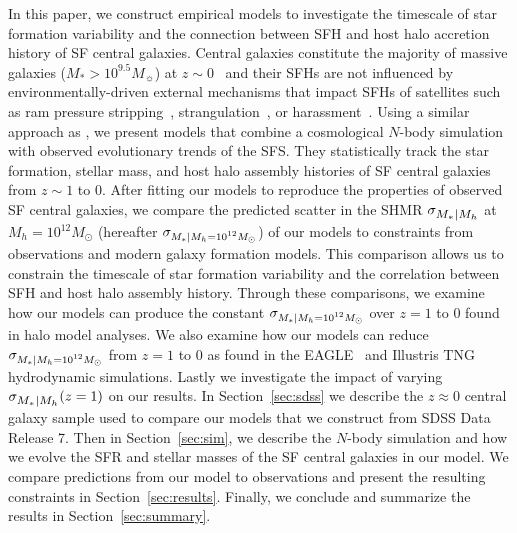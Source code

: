 \documentclass[12pt, letterpaper, preprint, tighten]{aastex62}
\newcommand{\siglogm}{\sigma_{\scaleto{M_*|M_h}{8pt}}}
\newcommand{\sigtwe}{\sigma_{\scaleto{M_*|M_h=10^{12}M_\odot}{8pt}}}
\begin{document}
In this paper, we construct empirical models to investigate the timescale
of star formation variability and the connection between SFH and host halo
accretion history of SF central galaxies. Central galaxies constitute the 
majority of massive galaxies ($M_*>10^{9.5}M_\sun$) at $z\sim0$~\citep{wetzel2013} 
and their SFHs are not influenced by environmentally-driven external 
mechanisms that impact SFHs of satellites such as ram pressure 
stripping~\citep{gunn1972,bekki2009}, strangulation~\citep{larson1980, peng2015}, 
or harassment~\citep{moore1998}. Using a similar approach as \cite{wetzel2013, hahn2017b}, 
we present models that combine a cosmological $N$-body simulation with observed 
evolutionary trends of the SFS. They statistically 
track the star formation, stellar mass, and host halo assembly histories of 
SF central galaxies from $z\sim1$ to $0$. After fitting our models to reproduce 
the properties of observed SF central galaxies, we compare the predicted 
scatter in the SHMR $\siglogm$ at $M_h=10^{12}M_\odot$ (hereafter $\sigtwe$) 
of our models to constraints from observations and modern galaxy formation 
models. This comparison allows us to constrain the timescale of star formation 
variability and the correlation between SFH and host halo assembly history. 
Through these comparisons, we examine how our models can produce the constant 
$\sigtwe$ over $z=1$ to 0 found in halo model analyses. We also examine how 
our models can reduce $\sigtwe$ from $z=1$ to 0 as found in the EAGLE~\citep{matthee2017} 
and Illustris TNG~\citep{pillepich2018} hydrodynamic simulations. Lastly 
we investigate the impact of varying $\siglogm(z=1)$ on our results. In 
Section~\ref{sec:sdss} we describe the $z\approx0$ central galaxy sample used to compare our models that we 
construct from SDSS Data Release 7. Then in Section~\ref{sec:sim}, we 
describe the $N$-body simulation and how we evolve the SFR and stellar 
masses of the SF central galaxies in our model. We compare predictions 
from our model to observations and present the resulting constraints in 
Section~\ref{sec:results}. Finally, we conclude and summarize the results 
in Section~\ref{sec:summary}.
\end{document}

